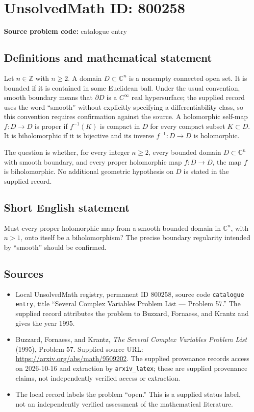 \documentclass[11pt]{article}
\newcommand{\Z}{\mathbb{Z}}
\newcommand{\C}{\mathbb{C}}
\begin{document}
\section*{UnsolvedMath ID: 800258}
\textbf{Source problem code:} catalogue entry
\subsection{Definitions and mathematical statement}
Let \(n\in\Z\) with \(n\geq 2\). A domain \(D\subset\C^n\) is a nonempty connected open set. It is bounded if it is contained in some Euclidean ball. Under the usual convention, smooth boundary means that \(\partial D\) is a \(C^\infty\) real hypersurface; the supplied record uses the word ``smooth'' without explicitly specifying a differentiability class, so this convention requires confirmation against the source. A holomorphic self-map \(f:D\to D\) is proper if \(f^{-1}(K)\) is compact in \(D\) for every compact subset \(K\subset D\). It is biholomorphic if it is bijective and its inverse \(f^{-1}:D\to D\) is holomorphic.

The question is whether, for every integer \(n\geq 2\), every bounded domain \(D\subset\C^n\) with smooth boundary, and every proper holomorphic map \(f:D\to D\), the map \(f\) is biholomorphic. No additional geometric hypothesis on \(D\) is stated in the supplied record.
\subsection{Short English statement}
Must every proper holomorphic map from a smooth bounded domain in \(\C^n\), with \(n>1\), onto itself be a biholomorphism? The precise boundary regularity intended by ``smooth'' should be confirmed.
\subsection{Sources}
\begin{itemize}
\item Local UnsolvedMath registry, permanent ID \(800258\), source code \texttt{catalogue entry}, title ``Several Complex Variables Problem List --- Problem 57.'' The supplied record attributes the problem to Buzzard, Fornaess, and Krantz and gives the year 1995.
\item Buzzard, Fornaess, and Krantz, \emph{The Several Complex Variables Problem List} (1995), Problem 57. Supplied source URL: \url{https://arxiv.org/abs/math/9509202}. The supplied provenance records access on 2026-10-16 and extraction by \texttt{arxiv\_latex}; these are supplied provenance claims, not independently verified access or extraction.
\item The local record labels the problem ``open.'' This is a supplied status label, not an independently verified assessment of the mathematical literature.
\end{itemize}
\end{document}

